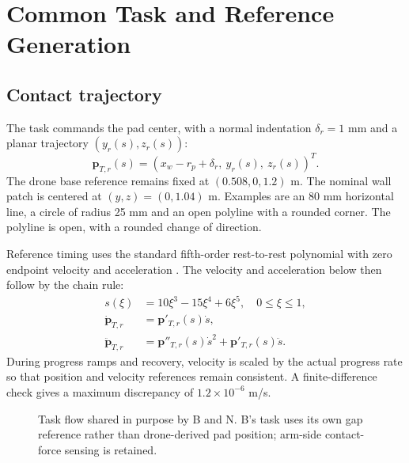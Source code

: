 \documentclass[conference]{IEEEtran}
\begin{document}
\section{Common Task and Reference Generation}
\subsection{Contact trajectory}
The task commands the pad center, with a normal indentation $\delta_r=1$ mm and a planar trajectory $(y_r(s),z_r(s))$:
\begin{equation}
\mathbf p_{T,r}(s)=(x_w-r_p+\delta_r,\ y_r(s),\ z_r(s))^T.
\end{equation}
The drone base reference remains fixed at $(0.508,0,1.2)$ m. The nominal wall patch is centered at $(y,z)=(0,1.04)$ m. Examples are an 80 mm horizontal line, a circle of radius 25 mm and an open polyline with a rounded corner. The polyline is open, with a rounded change of direction.

Reference timing uses the standard fifth-order rest-to-rest polynomial with zero endpoint velocity and acceleration \cite[Secs.~9.1--9.2]{lynch2017}. The velocity and acceleration below then follow by the chain rule:
\begin{align}
s(\xi)&=10\xi^3-15\xi^4+6\xi^5,\quad 0\leq\xi\leq1,\\
\dot{\mathbf p}_{T,r}&=\mathbf p'_{T,r}(s)\dot s,\\
\ddot{\mathbf p}_{T,r}&=\mathbf p''_{T,r}(s)\dot s^2+\mathbf p'_{T,r}(s)\ddot s.
\end{align}
During progress ramps and recovery, velocity is scaled by the actual progress rate so that position and velocity references remain consistent. A finite-difference check gives a maximum discrepancy of $1.2\times10^{-6}$ m/s.

\begin{figure}[t]
\centering
{}
\caption{Task flow shared in purpose by B and N. B's task uses its own gap reference rather than drone-derived pad position; arm-side contact-force sensing is retained.}
\label{fig:task}
\end{figure}
\end{document}
